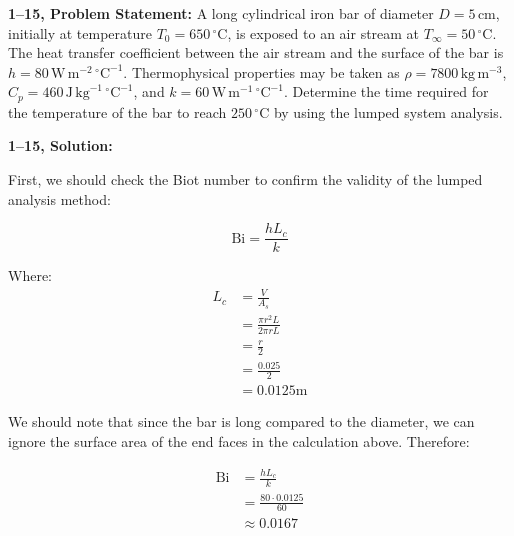 \documentclass[letterpaper,12pt]{article}
\begin{document}
\vspace{6pt}


\textbf{1--15, Problem Statement:}
A long cylindrical iron bar of diameter $D = 5\, \text{cm}$, initially at temperature $T_0 = 650\, {}^{\circ} \text{C}$, is exposed to an air stream at $T_{\infty} = 50\, {}^{\circ} \text{C}$. The heat transfer coefficient between the air stream and the surface of the bar is $h = 80\, \text{W}\,\text{m}^{-2}\,{}^\circ\text{C}^{-1}$. Thermophysical properties may be taken as $\rho = 7800\, \text{kg}\, \text{m}^{-3}$, $C_{p} = 460\, \text{J}\, \text{kg}^{-1}\, {}^{\circ} \text{C}^{-1}$, and $k = 60\, \text{W}\, \text{m}^{-1}\, {}^{\circ} \text{C}^{-1}$. Determine the time required for the temperature of the bar to reach $250\, {}^{\circ} \text{C}$ by using the lumped system analysis.

\vspace{6pt}

\textbf{1--15, Solution:}

First, we should check the Biot number to confirm the validity of the lumped analysis method:

\begin{equation}
    \mathrm{Bi} = \frac{h L_c}{k}
\end{equation}

Where:
\begin{equation}
\begin{aligned}
    L_c &= \frac{V}{A_s} \\
        &= \frac{\pi r^2 L}{2 \pi r L} \\
        &= \frac{r}{2} \\
        &= \frac{0.025}{2} \\
        &= 0.0125 \mathrm{m}
\end{aligned}
\end{equation}

We should note that since the bar is long compared to the diameter, we can ignore the surface area of the end faces in the calculation above. Therefore:

\begin{equation}
\begin{aligned}
        \mathrm{Bi} &= \frac{h L_c}{k} \\
                    &= \frac{80 \cdot 0.0125}{60} \\
                    &\approx 0.0167 
\end{aligned} 
\end{equation}
\end{document}
